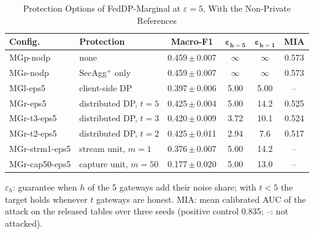\begin{table}[!t]
\centering
\caption{Protection Options of FedDP-Marginal at $\varepsilon = 5$, With the Non-Private References}
\label{tab:protection}
\scriptsize
\setlength{\tabcolsep}{2.8pt}
\begin{tabular}{l l c c c c}
\toprule
\textbf{Config.} & \textbf{Protection} & \textbf{Macro-F1} & $\boldsymbol{\varepsilon_{h=5}}$ & $\boldsymbol{\varepsilon_{h=1}}$ & \textbf{MIA} \\
\midrule
MGp-nodp       & none                     & 0.459\,$\pm$\,0.007 & $\infty$ & $\infty$ & 0.573 \\
MGs-nodp       & SecAgg$^+$ only          & 0.459\,$\pm$\,0.007 & $\infty$ & $\infty$ & 0.573 \\
MGl-eps5       & client-side DP           & 0.397\,$\pm$\,0.006 & 5.00 & 5.00 & -- \\
MGr-eps5       & distributed DP, $t = 5$  & 0.425\,$\pm$\,0.004 & 5.00 & 14.2 & 0.525 \\
MGr-t3-eps5    & distributed DP, $t = 3$  & 0.420\,$\pm$\,0.009 & 3.72 & 10.1 & 0.524 \\
MGr-t2-eps5    & distributed DP, $t = 2$  & 0.425\,$\pm$\,0.011 & 2.94 & 7.6  & 0.517 \\
MGr-strm1-eps5 & stream unit, $m = 1$     & 0.376\,$\pm$\,0.007 & 5.00 & 14.2 & -- \\
MGr-cap50-eps5 & capture unit, $m = 50$   & 0.177\,$\pm$\,0.020 & 5.00 & 13.0 & -- \\
\bottomrule
\end{tabular}

\vspace{2pt}
\parbox{\columnwidth}{\scriptsize $\varepsilon_{h}$: guarantee when $h$ of the 5 gateways add their noise share; with $t < 5$ the target holds whenever $t$ gateways are honest. MIA: mean calibrated AUC of the attack on the released tables over three seeds (positive control 0.835; --: not attacked).}
\end{table}

